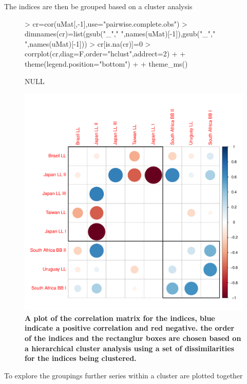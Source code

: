 \documentclass[shortnames,nojss,article]{jss}
\begin{document}
The indices are then be grouped based on a cluster analysis

\begin{figure}\begin{center}
\begin{Schunk}
\begin{Sinput}
> cr=cor(uMat[,-1],use="pairwise.complete.obs")
> dimnames(cr)=list(gsub("_"," ",names(uMat)[-1]),gsub("_"," ",names(uMat)[-1]))
> cr[is.na(cr)]=0
> corrplot(cr,diag=F,order="hclust",addrect=2)  +          
+              theme(legend.position="bottom")  +
+              theme_ms()
\end{Sinput}
\begin{Soutput}
NULL
\end{Soutput}
\end{Schunk}
\includegraphics{diags-010}
\caption{\bf{A plot of the correlation matrix for the indices, blue indicate a positive correlation 
and red negative. the order of the indices and the rectanglur boxes are chosen based on a hierarchical 
cluster analysis using a set of dissimilarities for the indices being clustered.}}
\label{cpue:3}
\end{center}
\end{figure}

To explore the groupings further series within a cluster are plotted together
\end{document}
